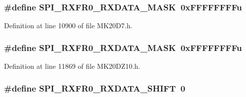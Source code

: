 \subsubsection[{\texorpdfstring{S\+P\+I\+\_\+\+R\+X\+F\+R0\+\_\+\+R\+X\+D\+A\+T\+A\+\_\+\+M\+A\+SK}{SPI_RXFR0_RXDATA_MASK}}]{\setlength{\rightskip}{0pt plus 5cm}\#define S\+P\+I\+\_\+\+R\+X\+F\+R0\+\_\+\+R\+X\+D\+A\+T\+A\+\_\+\+M\+A\+SK~0x\+F\+F\+F\+F\+F\+F\+F\+Fu}\hypertarget{group___s_p_i___register___masks_ga61ebb4d00d387b335d5b9d64d024e16f}{}\label{group___s_p_i___register___masks_ga61ebb4d00d387b335d5b9d64d024e16f}


Definition at line 10900 of file M\+K20\+D7.\+h.

\subsubsection[{\texorpdfstring{S\+P\+I\+\_\+\+R\+X\+F\+R0\+\_\+\+R\+X\+D\+A\+T\+A\+\_\+\+M\+A\+SK}{SPI_RXFR0_RXDATA_MASK}}]{\setlength{\rightskip}{0pt plus 5cm}\#define S\+P\+I\+\_\+\+R\+X\+F\+R0\+\_\+\+R\+X\+D\+A\+T\+A\+\_\+\+M\+A\+SK~0x\+F\+F\+F\+F\+F\+F\+F\+Fu}\hypertarget{group___s_p_i___register___masks_ga61ebb4d00d387b335d5b9d64d024e16f}{}\label{group___s_p_i___register___masks_ga61ebb4d00d387b335d5b9d64d024e16f}


Definition at line 11869 of file M\+K20\+D\+Z10.\+h.

\subsubsection[{\texorpdfstring{S\+P\+I\+\_\+\+R\+X\+F\+R0\+\_\+\+R\+X\+D\+A\+T\+A\+\_\+\+S\+H\+I\+FT}{SPI_RXFR0_RXDATA_SHIFT}}]{\setlength{\rightskip}{0pt plus 5cm}\#define S\+P\+I\+\_\+\+R\+X\+F\+R0\+\_\+\+R\+X\+D\+A\+T\+A\+\_\+\+S\+H\+I\+FT~0}\hypertarget{group___s_p_i___register___masks_ga030988e177b7d3ab914b5bb4cd734463}{}\label{group___s_p_i___register___masks_ga030988e177b7d3ab914b5bb4cd734463}


